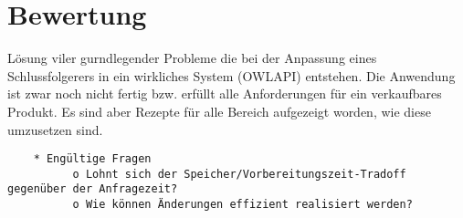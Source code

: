 \chapter{Bewertung}

Lösung viler gurndlegender Probleme die bei der Anpassung eines Schlussfolgerers in ein wirkliches System (OWLAPI) entstehen. Die Anwendung ist zwar noch nicht fertig bzw. erfüllt alle Anforderungen für ein verkaufbares Produkt. Es sind aber Rezepte für alle Bereich aufgezeigt worden, wie diese umzusetzen sind.

\begin{verbatim}
    * Engültige Fragen
          o Lohnt sich der Speicher/Vorbereitungszeit-Tradoff gegenüber der Anfragezeit?
          o Wie können Änderungen effizient realisiert werden? 
\end{verbatim}
